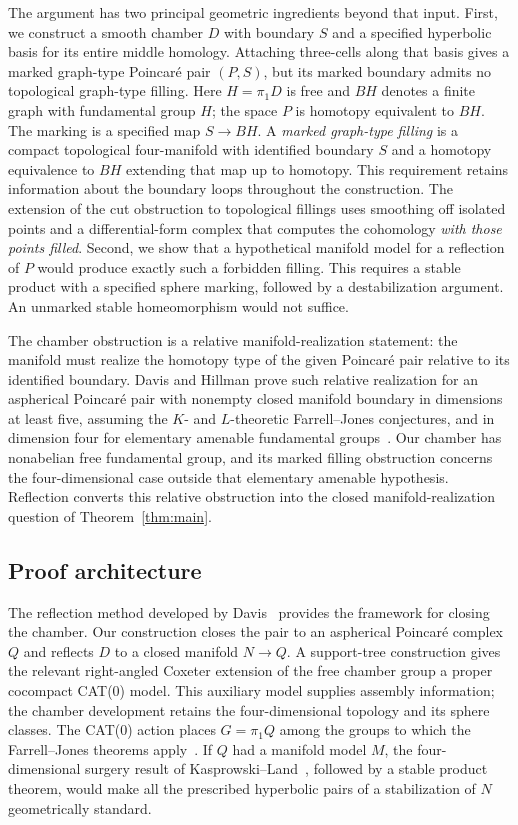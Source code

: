 \documentclass[11pt]{article}
\theoremstyle{definition}
\theoremstyle{remark}
\begin{document}
The argument has two principal geometric ingredients beyond that input.
First, we construct a smooth chamber $D$ with boundary $S$ and a specified
hyperbolic basis for its entire middle homology. Attaching three-cells along that basis
gives a marked graph-type Poincar\'e pair $(P,S)$, but its marked boundary
admits no topological graph-type filling.
Here $H=\pi_1D$ is free and $BH$ denotes a finite graph with fundamental
group $H$; the space $P$ is homotopy equivalent to $BH$.
The marking is a specified map $S\to BH$. A
\emph{marked graph-type filling} is a compact topological four-manifold
with identified boundary $S$ and a homotopy equivalence to $BH$ extending
that map up to homotopy. This requirement retains information about the
boundary loops throughout the construction.
The extension of the cut obstruction to topological fillings uses
smoothing off isolated points and a differential-form complex that
computes the cohomology \emph{with those points filled}. Second, we show
that a hypothetical manifold model for a reflection of $P$ would produce
exactly such a forbidden filling. This requires a stable product with a
specified sphere marking, followed by a destabilization argument. An
unmarked stable homeomorphism would not suffice.

The chamber obstruction is a relative manifold-realization statement:
the manifold must realize the homotopy type of the given Poincar\'e pair
relative to its identified boundary. Davis and Hillman prove such relative realization for an
aspherical Poincar\'e pair with nonempty closed manifold boundary in
dimensions at least five, assuming the $K$- and $L$-theoretic
Farrell--Jones conjectures, and in dimension four for elementary
amenable fundamental groups~\cite[Theorem~D]{DavisHillman}. Our chamber
has nonabelian free fundamental group, and its marked filling obstruction concerns
the four-dimensional case outside that elementary amenable hypothesis.
Reflection converts this relative obstruction into the closed
manifold-realization question of Theorem~\ref{thm:main}.

\subsection{Proof architecture}
The reflection method developed by Davis~\cite[Sections~13 and~15]{Davis1983}
provides the framework for closing the chamber. Our construction closes
the pair to an aspherical Poincar\'e
complex $Q$ and reflects $D$ to a closed manifold $N\to Q$. A
support-tree construction gives the relevant right-angled Coxeter
extension of the free chamber group a proper cocompact CAT(0) model.
This auxiliary model supplies assembly information; the chamber
development retains the four-dimensional topology and its sphere classes.
The CAT(0) action places $G=\pi_1Q$ among the groups to which the Farrell--Jones
theorems apply~\cite{BL,Wegner}. If $Q$ had a manifold model $M$, the
four-dimensional surgery result of Kasprowski--Land~\cite{KL}, followed
by a stable product theorem, would make all the prescribed hyperbolic
pairs of a stabilization of $N$ geometrically standard.
\end{document}
